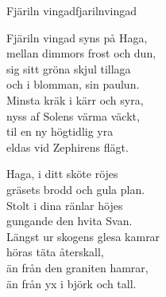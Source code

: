 \begin{song}{Fjäriln vingad}{fjarilnvingad}
\begin{vers}
Fjäriln vingad syns på Haga,\\
mellan dimmors frost och dun,\\
sig sitt gröna skjul tillaga\\
och i blomman, sin paulun.\\
Minsta kräk i kärr och syra,\\
nyss af Solens värma väckt,\\
til en ny högtidlig yra\\
eldas vid Zephirens flägt.\\
\end{vers}
\begin{vers}   
Haga, i ditt sköte röjes\\
gräsets brodd och gula plan.\\
Stolt i dina ränlar höjes\\
gungande den hvita Svan.\\
Längst ur skogens glesa kamrar\\
höras täta återskall,\\
än från den graniten hamrar,\\
än från yx i björk och tall.\\
\end{vers}
\end{song}


